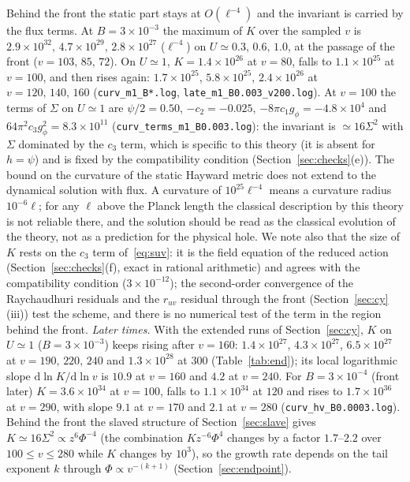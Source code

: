 \documentclass[11pt]{article}
\begin{document}
Behind the front the static part stays at $O(\ell^{-4})$ and the invariant is carried by the flux terms. At $B=3\times10^{-3}$ the maximum of $K$ over the sampled $v$ is $2.9\times10^{32},\,4.7\times10^{29},\,2.8\times10^{27}$ ($\ell^{-4}$) on $U\simeq0.3,\,0.6,\,1.0$, at the passage of the front ($v=103,\,85,\,72$). On $U\simeq1$, $K=1.4\times10^{26}$ at $v=80$, falls to $1.1\times10^{25}$ at $v=100$, and then rises again: $1.7\times10^{25}$, $5.8\times10^{25}$, $2.4\times10^{26}$ at $v=120,\,140,\,160$ (\texttt{curv\_m1\_B*.log}, \texttt{late\_m1\_B0.003\_v200.log}). At $v=100$ the terms of $\Sigma$ on $U\simeq1$ are $\psi/2=0.50$, $-c_2=-0.025$, $-8\pi c_1g_\phi=-4.8\times10^{4}$ and $64\pi^{2}c_3g_\phi^{2}=8.3\times10^{11}$ (\texttt{curv\_terms\_m1\_B0.003.log}): the invariant is $\simeq16\Sigma^{2}$ with $\Sigma$ dominated by the $c_3$ term, which is specific to this theory (it is absent for $h=\psi$) and is fixed by the compatibility condition (Section~\ref{sec:checks}(e)). The bound on the curvature of the static Hayward metric does not extend to the dynamical solution with flux. A curvature of $10^{25}\ell^{-4}$ means a curvature radius $10^{-6}\ell$; for any $\ell$ above the Planck length the classical description by this theory is not reliable there, and the solution should be read as the classical evolution of the theory, not as a prediction for the physical hole. We note also that the size of $K$ rests on the $c_3$ term of~\eqref{eq:suv}: it is the field equation of the reduced action (Section~\ref{sec:checks}(f), exact in rational arithmetic) and agrees with the compatibility condition ($3\times10^{-12}$); the second-order convergence of the Raychaudhuri residuals and the $r_{uv}$ residual through the front (Section~\ref{sec:cy}(iii)) test the scheme, and there is no numerical test of the term in the region behind the front. \emph{Later times.} With the extended runs of Section~\ref{sec:cy}, $K$ on $U\simeq1$ ($B=3\times10^{-3}$) keeps rising after $v=160$: $1.4\times10^{27}$, $4.3\times10^{27}$, $6.5\times10^{27}$ at $v=190,\,220,\,240$ and $1.3\times10^{28}$ at $300$ (Table~\ref{tab:end}); its local logarithmic slope $\mathrm{d}\ln K/\mathrm{d}\ln v$ is $10.9$ at $v=160$ and $4.2$ at $v=240$. For $B=3\times10^{-4}$ (front later) $K=3.6\times10^{34}$ at $v=100$, falls to $1.1\times10^{34}$ at $120$ and rises to $1.7\times10^{36}$ at $v=290$, with slope $9.1$ at $v=170$ and $2.1$ at $v=280$ (\texttt{curv\_hv\_B0.0003.log}). Behind the front the slaved structure of Section~\ref{sec:slave} gives $K\simeq16\Sigma^{2}\propto z^{6}\Phi^{-4}$ (the combination $Kz^{-6}\Phi^{4}$ changes by a factor $1.7$--$2.2$ over $100\le v\le280$ while $K$ changes by $10^{3}$), so the growth rate depends on the tail exponent $k$ through $\Phi\propto v^{-(k+1)}$ (Section~\ref{sec:endpoint}).
\end{document}
